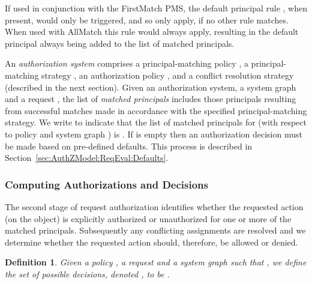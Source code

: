 \documentclass{article}
\newtheorem{definition}{Definition}
\begin{document}
If used in conjunction with the \textsf{FirstMatch} PMS, the default principal rule , when present, would only be triggered, and so only apply, if no other rule matches.
When used with \textsf{AllMatch} this rule would always apply, resulting in the default principal always being added to the list of matched principals.

An \emph{authorization system} comprises a principal-matching policy , a principal-matching strategy , an authorization policy , and a conflict resolution strategy  (described in the next section).
Given an authorization system, a system graph  and a request , the list of \emph{matched principals}  includes those principals resulting from successful matches made in accordance with the specified principal-matching strategy. We write  to indicate that the list of matched principals for  (with respect to policy  and system graph ) is .
If  is empty then an authorization decision must be made based on pre-defined defaults. This process is described in Section~\ref{sec:AuthZModel:ReqEval:Defaults}.

\subsubsection{Computing Authorizations and Decisions}\label{sec:AuthZModel:ReqEval:S2}
The second stage of request authorization identifies whether the requested action (on the object) is explicitly authorized or unauthorized for one or more of the matched principals. Subsequently any conflicting assignments are resolved and we determine whether the requested action should, therefore, be allowed or denied.

\begin{definition}
    Given a policy , a request  and a system graph  such that , we define the set of \emph{possible decisions}, denoted , to be .
\end{definition}
\end{document}

